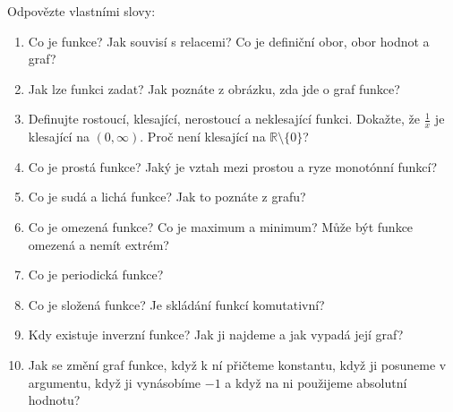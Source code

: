 \begin{problem}
  Odpovězte vlastními slovy:
  \begin{enumerate}
    \item Co je funkce? Jak souvisí s relacemi? Co je definiční obor, obor hodnot a graf?
    \item Jak lze funkci zadat? Jak poznáte z obrázku, zda jde o graf funkce?
    \item Definujte rostoucí, klesající, nerostoucí a neklesající funkci. Dokažte, že $\frac{1}{x}$ je klesající na $(0, \infty)$. Proč není klesající na $\mathbb{R}\setminus\{0\}$?
    \item Co je prostá funkce? Jaký je vztah mezi prostou a ryze monotónní funkcí?
    \item Co je sudá a lichá funkce? Jak to poznáte z grafu?
    \item Co je omezená funkce? Co je maximum a minimum? Může být funkce omezená a nemít extrém?
    \item Co je periodická funkce?
    \item Co je složená funkce? Je skládání funkcí komutativní?
    \item Kdy existuje inverzní funkce? Jak ji najdeme a jak vypadá její graf?
    \item Jak se změní graf funkce, když k ní přičteme konstantu, když ji posuneme v argumentu, když ji vynásobíme $-1$ a když na ni použijeme absolutní hodnotu?
  \end{enumerate}
\end{problem}

